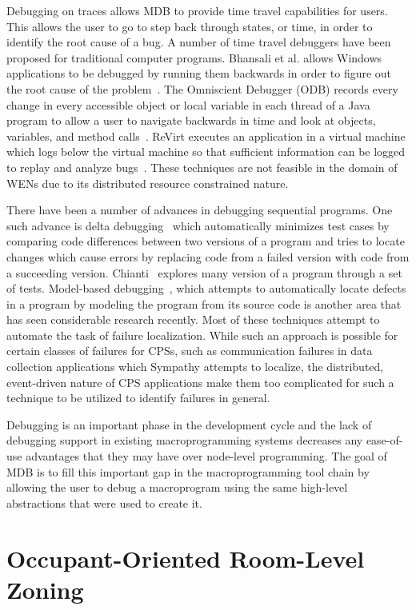 Debugging on traces allows MDB to provide time travel capabilities for
users. This allows the user to go to step back through states, or time, in order
to identify the root cause of a bug. A number of time travel debuggers have been
proposed for traditional computer programs. Bhansali et al. allows Windows
applications to be debugged by running them backwards in order to figure out the
root cause of the problem~\cite{Bhansali2006}. The Omniscient Debugger (ODB)
records every change in every accessible object or local variable in each thread
of a Java program to allow a user to navigate backwards in time and look at
objects, variables, and method calls~\cite{Lewis2003}. ReVirt executes an
application in a virtual machine which logs below the virtual machine so that
sufficient information can be logged to replay and analyze
bugs~\cite{Dunlap2002}. These techniques are not feasible in the domain of WENs
due to its distributed resource constrained nature.

There have been a number of advances in debugging sequential programs. One such
advance is delta debugging~\cite{Zeller1999} which automatically minimizes test
cases by comparing code differences between two versions of a program and tries
to locate changes which cause errors by replacing code from a failed version
with code from a succeeding version. Chianti~\cite{Ren2004} explores many
version of a program through a set of tests. Model-based
debugging~\cite{Mayer2008}, which attempts to automatically locate defects in a
program by modeling the program from its source code is another area that has
seen considerable research recently. Most of these techniques attempt to
automate the task of failure localization. While such an approach is possible
for certain classes of failures for CPSs, such as communication failures in data
collection applications which Sympathy attempts to localize, the distributed,
event-driven nature of CPS applications make them too complicated for such a
technique to be utilized to identify failures in general.

Debugging is an important phase in the development cycle and the lack of
debugging support in existing macroprogramming systems decreases any ease-of-use
advantages that they may have over node-level programming.  The goal of MDB is
to fill this important gap in the macroprogramming tool chain by allowing the
user to debug a macroprogram using the same high-level abstractions that were
used to create it.

\section{Occupant-Oriented Room-Level Zoning}

